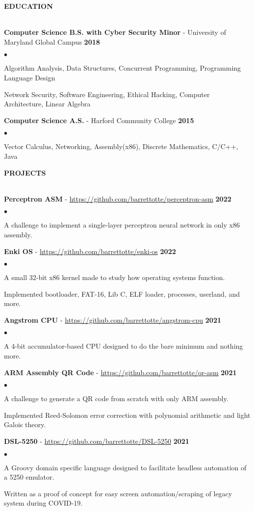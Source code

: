 \documentclass{article}
\newcommand{\lineunder}{
	\vspace*{-4pt}\\ 
	\hspace*{-18pt}\hrulefill \\
}
\newcommand{\header}[1]{
	{\hspace*{-15pt}\vspace*{6pt}\textsc{#1}}\vspace*{-6pt}\lineunder
}
\newcommand{\education}[3]{
	\textbf{#1} - #2 \hfill \textbf{#3} \vspace*{3pt}
}
\newcommand{\project}[3]{
	\vspace*{3pt} \textbf{#1} - \small{\href{#2}{#2}} \hfill \textbf{#3} \vspace*{2pt}
}
\newenvironment{resumelist}{
	\vspace*{2pt}
	\begin{list}
		{\small$\bullet$}{\topsep 0pt \itemsep -2pt}}{\vspace*{4pt}
	\end{list}
}
\newcommand{\resumeheader}[1]{
	\vspace*{10pt}
	\header{\textbf{#1}}
    \vspace*{3pt}
}
\begin{document}
	\resumeheader{EDUCATION}
		\education 
			{Computer Science B.S. with Cyber Security Minor}{University of Maryland Global Campus} 
			{2018}
			\begin{resumelist}
				\item Algorithm Analysis, Data Structures, Concurrent Programming, Programming Language Design
				\item Network Security, Software Engineering, Ethical Hacking, Computer Architecture, Linear Algebra
			\end{resumelist}
			\vspace*{6pt}
		\education
			{Computer Science A.S.}{Harford Community College}
			{2015}
			\begin{resumelist}
				\item Vector Calculus, Networking, Assembly(x86), Discrete Mathematics, C/C++, Java
			\end{resumelist}
	
	\resumeheader{PROJECTS}
		\project
			{Perceptron ASM}{https://github.com/barrettotte/perceptron-asm}
			{2022}
			\begin{resumelist}
				\item A challenge to implement a single-layer perceptron neural network in only x86 assembly.
			\end{resumelist}
		\project
			{Enki OS}{https://github.com/barrettotte/enki-os}
			{2022}
			\begin{resumelist}
				\item A small 32-bit x86 kernel made to study how operating systems function.
				\item Implemented bootloader, FAT-16, Lib C, ELF loader, processes, userland, and more.
			\end{resumelist}
		\project
			{Angstrom CPU}{https://github.com/barrettotte/angstrom-cpu}
			{2021}
			\begin{resumelist}
				\item A 4-bit accumulator-based CPU designed to do the bare minimum and nothing more.
			\end{resumelist}
		\project
			{ARM Assembly QR Code}{https://github.com/barrettotte/qr-asm}
			{2021}
			\begin{resumelist}
				\item A challenge to generate a QR code from scratch with only ARM assembly.
				\item Implemented Reed-Solomon error correction with polynomial arithmetic and light Galois theory.
			\end{resumelist}
		\project
			{DSL-5250}{https://github.com/barrettotte/DSL-5250}
			{2021}
			\begin{resumelist}
				\item A Groovy domain specific language designed to facilitate headless automation of a 5250 emulator.
				\item Written as a proof of concept for easy screen automation/scraping of legacy system during COVID-19.
			\end{resumelist}
\end{document}
